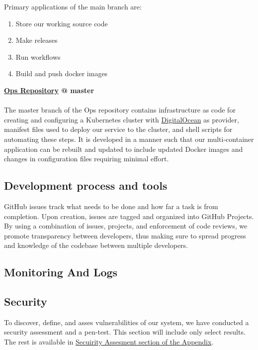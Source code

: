 Primary applications of the main branch are:
\begin{enumerate}
    \item Store our working source code
    \item Make releases
    \item Run workflows
    \item Build and push docker images\\
\end{enumerate}

\textbf{\hyperref[app:opsRepo]{Ops Repository} @ master}\\\\
The master branch of the Ops repository contains infrastructure as code for creating and configuring a Kubernetes cluster with \href{https://www.digitalocean.com/}{DigitalOcean} as provider, manifest files used to deploy our service to the cluster, and shell scripts for automating these steps. It is developed in a manner such that our multi-container application can be rebuilt and updated to include updated Docker images and changes in configuration files requiring minimal effort.

\subsection{Development process and tools}
\label{subsec:process&tools}
GitHub issues track what needs to be done and how far a task is from completion. Upon creation, issues are tagged and organized into GitHub Projects. By using a combination of issues, projects, and enforcement of code reviews, we promote transparency between developers, thus making sure to spread progress and knowledge of the codebase between multiple developers.

\subsection{Monitoring And Logs}
\label{subsec:monitoring}

\subsection{Security}
\label{subsec:security}
To discover, define, and asses vulnerabilities of our system, we have conducted a security assessment and a pen-test. This section will include only select results. The rest is available in \hyperref[app:secAss]{Secuirity Assesment section of the Appendix}.

